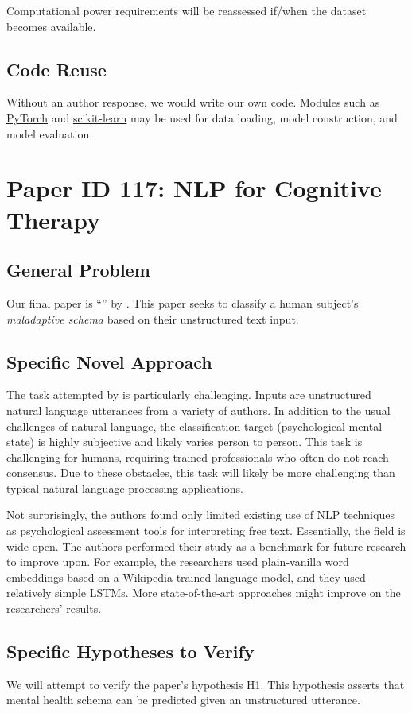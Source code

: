 \documentclass[11pt,a4paper]{article}
\begin{document}
Computational power requirements will be reassessed if/when the dataset becomes available. 

\subsection{Code Reuse}
Without an author response, we would write our own code. Modules such as \href{https://pytorch.org/}{PyTorch} and \href{https://scikit-learn.org/stable/}{scikit-learn} may be used for data loading, model construction, and model evaluation. 

\section{Paper ID 117: NLP for Cognitive Therapy}
\subsection{General Problem}
Our final paper is ``'' by \citeauthor*{burger_2021}. This paper seeks to classify a human subject's \emph{maladaptive schema} based on their unstructured text input. 

\subsection{Specific Novel Approach}
The task attempted by \citet{burger_2021} is particularly challenging. Inputs are unstructured natural language utterances from a variety of authors. In addition to the usual challenges of natural language, the classification target (psychological mental state) is highly subjective and likely varies person to person. This task is challenging for humans, requiring trained professionals who often do not reach consensus. Due to these obstacles, this task will likely be more challenging than typical natural language processing applications.

Not surprisingly, the authors found only limited existing use of NLP techniques as psychological assessment tools for interpreting free text. Essentially, the field is wide open. The authors performed their study as a benchmark for future research to improve upon. For example, the researchers used plain-vanilla word embeddings based on a Wikipedia-trained language model, and they used relatively simple LSTMs. More state-of-the-art approaches might improve on the researchers' results.

\subsection{Specific Hypotheses to Verify}
We will attempt to verify the paper's hypothesis H1. This hypothesis asserts that mental health schema can be predicted given an unstructured utterance. 
\end{document}
